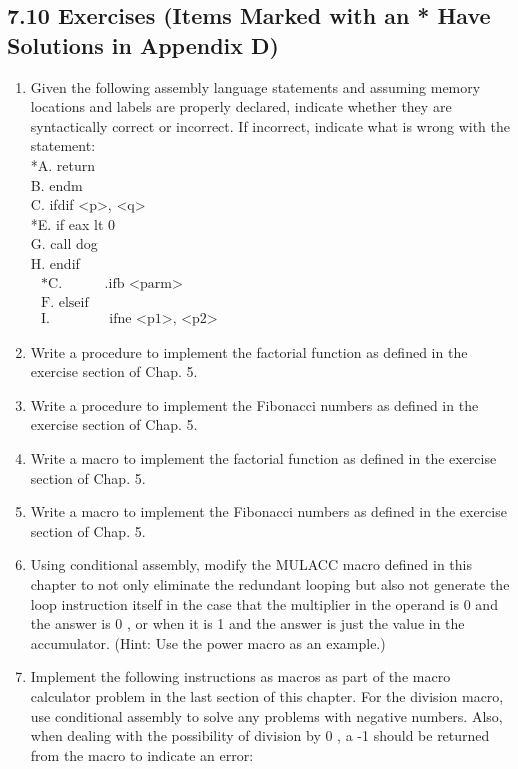 \documentclass[10pt]{article}
\begin{document}
\subsection*{7.10 Exercises (Items Marked with an * Have Solutions in Appendix D)}
\begin{enumerate}
  \item Given the following assembly language statements and assuming memory locations and labels are properly declared, indicate whether they are syntactically correct or incorrect. If incorrect, indicate what is wrong with the statement:\\
*A. return\\
B. endm\\
C. ifdif <p>, <q>\\
*E. if eax lt 0\\
G. call dog\\
H. endif\\
$\begin{array}{ll}\text { *C. } & \text {.ifb <parm> } \\ \text { F. elseif } \\ \text { I. } & \text { ifne <p1>, <p2> }\end{array}$
  \item Write a procedure to implement the factorial function as defined in the exercise section of Chap. 5.
  \item Write a procedure to implement the Fibonacci numbers as defined in the exercise section of Chap. 5.
  \item Write a macro to implement the factorial function as defined in the exercise section of Chap. 5.
  \item Write a macro to implement the Fibonacci numbers as defined in the exercise section of Chap. 5.
  \item Using conditional assembly, modify the MULACC macro defined in this chapter to not only eliminate the redundant looping but also not generate the loop instruction itself in the case that the multiplier in the operand is 0 and the answer is 0 , or when it is 1 and the answer is just the value in the accumulator. (Hint: Use the power macro as an example.)
  \item Implement the following instructions as macros as part of the macro calculator problem in the last section of this chapter. For the division macro, use conditional assembly to solve any problems with negative numbers. Also, when dealing with the possibility of division by 0 , a -1 should be returned from the macro to indicate an error:
\end{enumerate}
\end{document}
